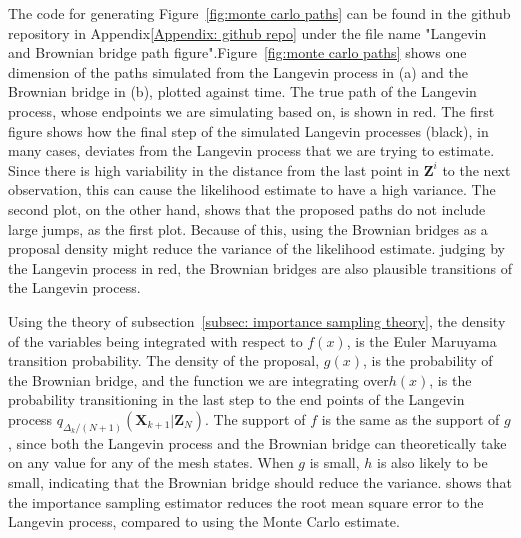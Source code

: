 The code for generating Figure~\ref{fig:monte carlo paths} can be found in the github repository in Appendix\ref{Appendix: github repo} under the file name "Langevin and Brownian bridge path figure".Figure~\ref{fig:monte carlo paths} shows one dimension of the paths simulated from the Langevin process in (a) and the Brownian bridge in (b), plotted against time. The true path of the Langevin process, whose endpoints we are simulating based on, is shown in red. The first figure shows how the final step of the simulated Langevin processes (black), in many cases, deviates from the Langevin process that we are trying to estimate. Since there is high variability in the distance from the last point in $\textbf{Z}^i$ to the next observation, this can cause the likelihood estimate to have a high variance. The second plot, on the other hand, shows that the proposed paths do not include large jumps, as the first plot. Because of this, using the Brownian bridges as a proposal density might reduce the variance of the likelihood estimate. judging by the Langevin process in red, the Brownian bridges are also plausible transitions of the Langevin process. 


Using the theory of subsection~\ref{subsec: importance sampling theory}, the density of the variables being integrated with respect to $f(x)$, is the Euler Maruyama transition probability. The density of the proposal, $g(x)$, is the probability of the Brownian bridge, and the function we are integrating over$h(x)$, is the probability transitioning in the last step to the end points of the Langevin process $q_{\Delta_k/(N+1)}(\textbf{X}_{k+1}|\textbf{Z}_N)$. The support of $f$ is the same as the support of $g$, since both the Langevin process and the Brownian bridge can theoretically take on any value for any of the mesh states. When $g$ is small, $h$ is also likely to be small, indicating that the Brownian bridge should reduce the variance. \parencite{durham_numerical_2002}  shows that the importance sampling estimator reduces the root mean square error to the Langevin process, compared to using the Monte Carlo estimate.


